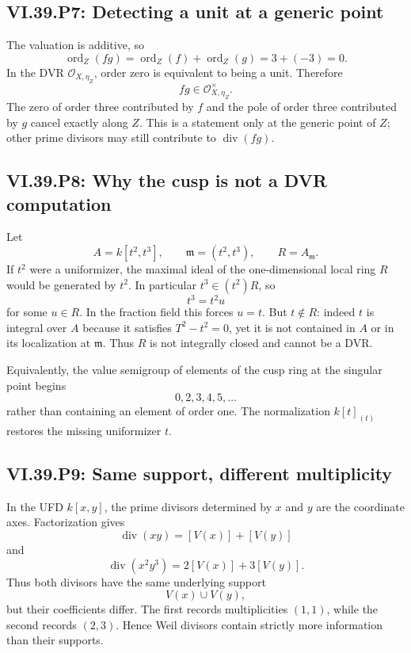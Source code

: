 \subsection*{VI.39.P7: Detecting a unit at a generic point}
\begin{solution}
The valuation is additive, so
\[
 \operatorname{ord}_Z(fg)
 =\operatorname{ord}_Z(f)+\operatorname{ord}_Z(g)
 =3+(-3)=0.
\]
In the DVR \(\mathcal O_{X,\eta_Z}\), order zero is equivalent to being a unit.  Therefore
\[
 \boxed{fg\in\mathcal O_{X,\eta_Z}^{\times}.}
\]
The zero of order three contributed by \(f\) and the pole of order three contributed by \(g\) cancel exactly along \(Z\).  This is a statement only at the generic point of \(Z\); other prime divisors may still contribute to \(\operatorname{div}(fg)\).
\end{solution}

\subsection*{VI.39.P8: Why the cusp is not a DVR computation}
\begin{solution}
Let
\[
 A=k[t^2,t^3],\qquad \mathfrak m=(t^2,t^3),\qquad R=A_{\mathfrak m}.
\]
If \(t^2\) were a uniformizer, the maximal ideal of the one-dimensional local ring \(R\) would be generated by \(t^2\).  In particular \(t^3\in(t^2)R\), so
\[
 t^3=t^2u
\]
for some \(u\in R\).  In the fraction field this forces \(u=t\).  But \(t\notin R\): indeed \(t\) is integral over \(A\) because it satisfies \(T^2-t^2=0\), yet it is not contained in \(A\) or in its localization at \(\mathfrak m\).  Thus \(R\) is not integrally closed and cannot be a DVR.

Equivalently, the value semigroup of elements of the cusp ring at the singular point begins
\[
 0,2,3,4,5,\ldots
\]
rather than containing an element of order one.  The normalization \(k[t]_{(t)}\) restores the missing uniformizer \(t\).
\end{solution}

\subsection*{VI.39.P9: Same support, different multiplicity}
\begin{solution}
In the UFD \(k[x,y]\), the prime divisors determined by \(x\) and \(y\) are the coordinate axes.  Factorization gives
\[
 \operatorname{div}(xy)=[V(x)]+[V(y)]
\]
and
\[
 \operatorname{div}(x^2y^3)=2[V(x)]+3[V(y)].
\]
Thus both divisors have the same underlying support
\[
 V(x)\cup V(y),
\]
but their coefficients differ.  The first records multiplicities \((1,1)\), while the second records \((2,3)\).  Hence Weil divisors contain strictly more information than their supports.
\end{solution}

